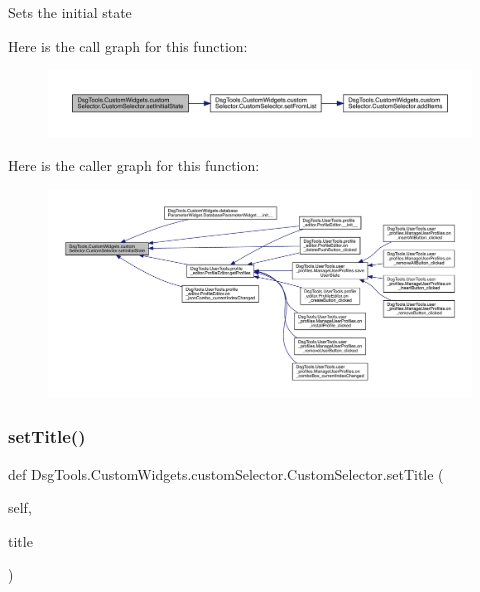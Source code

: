 \begin{DoxyVerb}Sets the initial state
\end{DoxyVerb}
 Here is the call graph for this function\+:
\nopagebreak
\begin{figure}[H]
\begin{center}
\leavevmode
\includegraphics[width=350pt]{class_dsg_tools_1_1_custom_widgets_1_1custom_selector_1_1_custom_selector_aac11f7aaf31b6f965064f1c763820a6d_cgraph}
\end{center}
\end{figure}
Here is the caller graph for this function\+:
\nopagebreak
\begin{figure}[H]
\begin{center}
\leavevmode
\includegraphics[width=350pt]{class_dsg_tools_1_1_custom_widgets_1_1custom_selector_1_1_custom_selector_aac11f7aaf31b6f965064f1c763820a6d_icgraph}
\end{center}
\end{figure}
\mbox{\label{class_dsg_tools_1_1_custom_widgets_1_1custom_selector_1_1_custom_selector_af2924a39b139ecacdb4af5e9414b9d0e}} 
\subsubsection{\texorpdfstring{set\+Title()}{setTitle()}}
{\footnotesize\ttfamily def Dsg\+Tools.\+Custom\+Widgets.\+custom\+Selector.\+Custom\+Selector.\+set\+Title (\begin{DoxyParamCaption}\item[{}]{self,  }\item[{}]{title }\end{DoxyParamCaption})}

